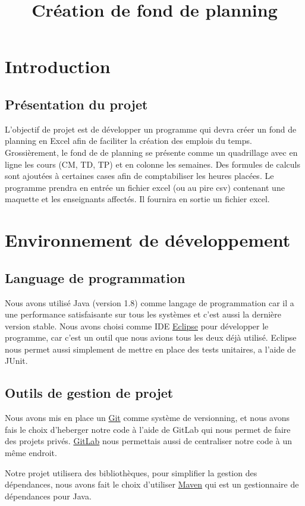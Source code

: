 \documentclass{polytech/polytech}
\title{Création de fond de planning}
\begin{document}
	\chapter{Introduction}
	\section{Présentation du projet}
	L’objectif de projet est de développer un programme qui devra créer un fond de planning en Excel afin de faciliter la création des emplois du temps.
	Grossièrement, le fond de de planning se présente comme un quadrillage avec en ligne les cours (CM, TD, TP) et en colonne les semaines.
	Des formules de calculs sont ajoutées à certaines cases afin de comptabiliser les heures placées.
	Le programme prendra en entrée un fichier excel (ou au pire csv) contenant une maquette et les enseignants affectés. Il fournira en sortie un fichier excel.

	\chapter{Environnement de développement}
	\section{Language de programmation}
	Nous avons utilisé Java (version 1.8) comme langage de programmation car il a une performance satisfaisante sur tous les systèmes et c'est aussi la dernière version stable.
	Nous avons choisi comme IDE \href{http://www.eclipse.org}{Eclipse} pour développer le programme, car c'est un outil que nous avions tous les deux déjà utilisé.
	Eclipse nous permet aussi simplement de mettre en place des tests unitaires, a l'aide de JUnit.

	\clearpage

	\section{Outils de gestion de projet}

	Nous avons mis en place un \href{https://git-scm.com/}{Git} comme système de versionning, et nous avons fais le choix d'heberger notre code à l'aide de GitLab qui nous permet de faire des projets privés.
	\href{https://about.gitlab.com/}{GitLab} nous permettais aussi de centraliser notre code à un même endroit.

	Notre projet utilisera des bibliothèques, pour simplifier la gestion des dépendances, nous avons fait le choix d'utiliser \href{https://maven.apache.org/}{Maven} qui est un gestionnaire de dépendances pour Java.
\end{document}
